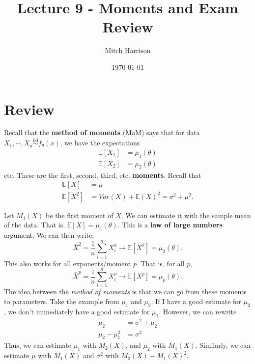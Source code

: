 \documentclass[titlepage, 12pt, leqno]{article}
\title{\Huge{Lecture 9 - Moments and Exam Review}}
\author{\large{Mitch Harrison}}
\date{\today}
\begin{document}
\setlength{\parskip}{1\baselineskip}
\setlength{\parindent}{15pt}
\maketitle
\tableofcontents
\newpage


\section{Review}

Recall that the \textbf{method of moments} (MoM) says that for data
$X_{1}, \cdots , X_{n} \overset{\mathrm{iid}}{\sim}f_{\theta}(x)$, we have the
expectations
\begin{align*}
    \mathbb{E}[X_{1}] &= \mu_{1}(\theta) \\
    \mathbb{E}[X_{2}] &= \mu_{2}(\theta)
\end{align*}
etc. These are the first, second, third, etc. \textbf{moments}. Recall that
\begin{align*}
    \mathbb{E}[X] &= \mu \\
    \mathbb{E}[X^{2}] &= Var(X) + \mathbb{E}(X)^{2} = \sigma^{2} + \mu^{2}.
\end{align*}

Let $M_{1}(X)$ be the first moment of $X$. We can estimate it with the sample
mean of the data. That is, $\mathbb{E}[X] = \mu_{1}(\theta)$. This is a
\textbf{law of large numbers} argument. We can then write,
\[
    \bar X^{2} = \frac{1}{n}\sum_{i=1}^{n}X_{i}^{2} \rightarrow \mathbb{E}[X^{2}]
    = \mu_{2}(\theta).
\]
This also works for all exponents/moment $p$. That is, for all $p$,
\[
    \bar X^{p} = \frac{1}{n}\sum_{i=1}^{n}X_{i}^{p} \rightarrow \mathbb{E}[X^{p}]
    = \mu_{p}(\theta).
\]
The idea between the \textit{method of moments} is that we can go from these
moments to parameters. Take the example from $\mu_{1}$ and $\mu_{2}$. If I have
a good estimate for $\mu_{2}$, we don't immediately have a good estimate for
$\mu_{1}$. However, we can rewrite
\begin{align*}
    \mu_{2} &= \sigma^{2} + \mu_{2} \\
    \mu_{2} - \mu_{1}^{2} &= \sigma^{2} 
\end{align*}
Thus, we can estimate $\mu_{1}$ with $M_{2}(X)$, and $\mu_{2}$ with $M_{1}(X)$.
Similarly, we can estimate $\mu$ with $M_{1}(X)$ and $\sigma^{2}$ with
$M_{2}(X) - M_{1}(X)^{2}$.
\end{document}
